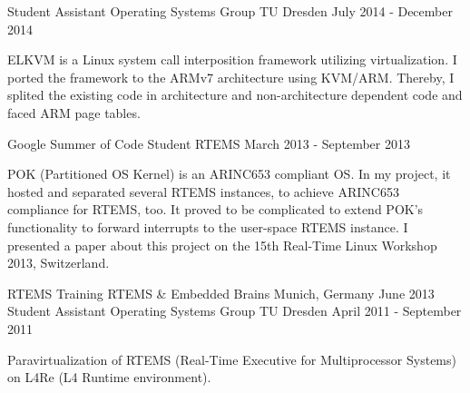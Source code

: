 \begin{cventries}
  \cventry
    {Student Assistant}
    {Operating Systems Group}
    {TU Dresden}
    {July 2014 - December 2014}
    {
      \begin{cvitems}
      \item[] {ELKVM is a Linux system call interposition framework utilizing
	  virtualization. I ported the framework to
	  the ARMv7 architecture using KVM/ARM. Thereby, I splited the existing
	  code in architecture and non-architecture dependent code and faced
	  ARM page tables. }
      \end{cvitems}
    }
  \cventry
    {Google Summer of Code Student}
    {RTEMS}
    {}
    {March 2013 - September 2013}
    {
      \begin{cvitems}
      \item[] {POK (Partitioned OS Kernel) is an ARINC653 compliant OS. In my
	  project, it hosted and separated several RTEMS instances, to achieve
      ARINC653 compliance for RTEMS, too. It proved to be complicated to extend
      POK's functionality to forward interrupts to the user-space RTEMS
      instance. I presented a paper about this project on the 15th Real-Time Linux
    Workshop 2013, Switzerland.}
      \end{cvitems}
    }
  \cventry
    {RTEMS Training}
    {RTEMS \& Embedded Brains}
    {Munich, Germany}
    {June 2013}
    {
    }
  \cventry
    {Student Assistant}
    {Operating Systems Group}
    {TU Dresden}
    {April 2011 - September 2011}
    {
      \begin{cvitems}
      \item[] {Paravirtualization of RTEMS (Real-Time Executive for
	Multiprocessor Systems) on L4Re (L4 Runtime environment).}
      \end{cvitems}
    }
\end{cventries}
